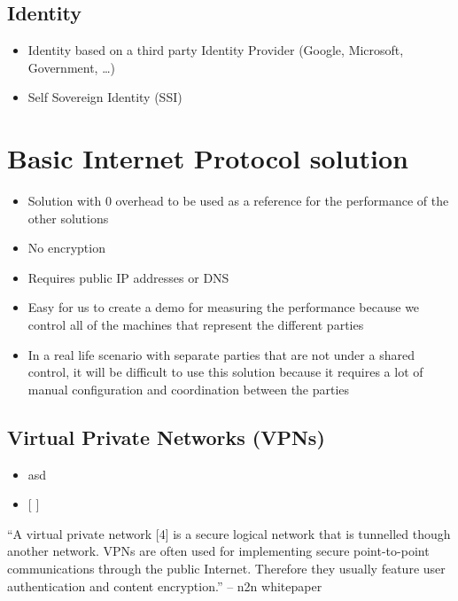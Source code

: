 \label{notes__02025-identity.md}
\subsection{Identity}\label{notes__02025-identity.md__identity}

\begin{itemize}
\tightlist
\item
  Identity based on a third party Identity Provider (Google, Microsoft, Government, \ldots)
\item
  Self Sovereign Identity (SSI)
\end{itemize}

\label{notes__02040-basic-ip.md}
\section{Basic Internet Protocol solution}\label{notes__02040-basic-ip.md__basic-internet-protocol-solution}

\begin{itemize}
\tightlist
\item
  Solution with 0 overhead to be used as a reference for the performance of the other solutions
\item
  No encryption
\item
  Requires public IP addresses or DNS
\item
  Easy for us to create a demo for measuring the performance because we control all of the machines that represent the different parties
\item
  In a real life scenario with separate parties that are not under a shared control, it will be difficult to use this solution because it requires a lot of manual configuration and coordination between the parties
\end{itemize}

\label{notes__02050-vpns.md}
\subsection{Virtual Private Networks (VPNs)}\label{notes__02050-vpns.md__virtual-private-networks-vpns}

\begin{itemize}
\item
  asd
\item
  {[} {]}
\end{itemize}

``A virtual private network {[}4{]} is a secure logical network that is tunnelled though
another network. VPNs are often used for implementing secure point-to-point
communications through the public Internet. Therefore they usually feature user
authentication and content encryption.'' -- n2n whitepaper

